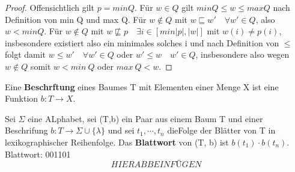     \createDiagram{}
    {
    }
    \newpage

    \begin{proof}
        Offensichtlich gilt \(p = min Q\). Für \(w \in Q\) gilt \(min Q \leq w \leq max Q\) nach Definition von min Q und max Q. Für \(w \not \in Q\) mit \(w \sqsubseteq w' \quad \forall w' \in Q\), also \(w < min Q\). Für \(w \not \in Q\) mit \(w \not \sqsubseteq p \quad \exists i \in [min {|p|, |w|}]\) mit \(w(i) \not = p(i)\), insbesondere existiert also ein minimales solches i und nach Definition von \(\leq\) folgt damit \(w \leq w' \quad \forall w'\in Q\) oder \(w' \leq w \quad w' \in Q\), insbesondere also wegen \( w \not \in Q\) somit \( w < min \ Q\) oder \(max \ Q < w\).
    \end{proof}

    Eine \textbf{Beschrftung} eines Baumes T mit Elementen einer Menge X ist eine Funktion \(b: T \to X\).

    Sei \(\Sigma\) eine ALphabet, sei (T,b) ein Paar aus einem Baum T und einer Beschrifung \(b: T \to \Sigma \cup \{\lambda\}\) und sei \(t_1, \cdots, t_n\) dieFolge der Blätter von T in lexikographischer Reihenfolge. Das \textbf{Blattwort} von (T, b) ist \(b(t_1) \cdot b(t_n)\). Blattwort: 001101 \[HIER ABB EINFÜGEN\] 
    \createDiagram{}{}

